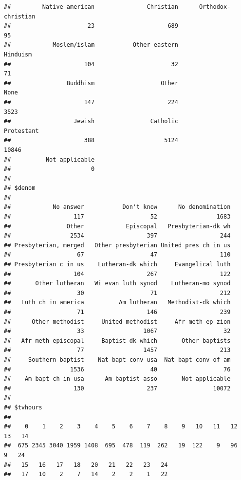 \documentclass[]{book}
\newenvironment{Shaded}{\begin{snugshade}}{\end{snugshade}}
\newcommand{\KeywordTok}[1]{\textcolor[rgb]{0.13,0.29,0.53}{\textbf{#1}}}
\newcommand{\NormalTok}[1]{#1}
\newcommand{\OperatorTok}[1]{\textcolor[rgb]{0.81,0.36,0.00}{\textbf{#1}}}
\newcommand{\StringTok}[1]{\textcolor[rgb]{0.31,0.60,0.02}{#1}}
\theoremstyle{definition}
\theoremstyle{definition}
\theoremstyle{definition}
\theoremstyle{remark}
\begin{document}
\begin{verbatim}
##         Native american               Christian      Orthodox-christian 
##                      23                     689                      95 
##            Moslem/islam           Other eastern                Hinduism 
##                     104                      32                      71 
##                Buddhism                   Other                    None 
##                     147                     224                    3523 
##                  Jewish                Catholic              Protestant 
##                     388                    5124                   10846 
##          Not applicable 
##                       0 
## 
## $denom
## 
##            No answer           Don't know      No denomination 
##                  117                   52                 1683 
##                Other            Episcopal   Presbyterian-dk wh 
##                 2534                  397                  244 
## Presbyterian, merged   Other presbyterian United pres ch in us 
##                   67                   47                  110 
## Presbyterian c in us    Lutheran-dk which     Evangelical luth 
##                  104                  267                  122 
##       Other lutheran   Wi evan luth synod    Lutheran-mo synod 
##                   30                   71                  212 
##   Luth ch in america          Am lutheran   Methodist-dk which 
##                   71                  146                  239 
##      Other methodist     United methodist     Afr meth ep zion 
##                   33                 1067                   32 
##   Afr meth episcopal     Baptist-dk which       Other baptists 
##                   77                 1457                  213 
##     Southern baptist    Nat bapt conv usa  Nat bapt conv of am 
##                 1536                   40                   76 
##    Am bapt ch in usa      Am baptist asso       Not applicable 
##                  130                  237                10072 
## 
## $tvhours
## 
##    0    1    2    3    4    5    6    7    8    9   10   11   12   13   14 
##  675 2345 3040 1959 1408  695  478  119  262   19  122    9   96    9   24 
##   15   16   17   18   20   21   22   23   24 
##   17   10    2    7   14    2    2    1   22
\end{verbatim}

\begin{Shaded}
\end{Shaded}
\end{document}
